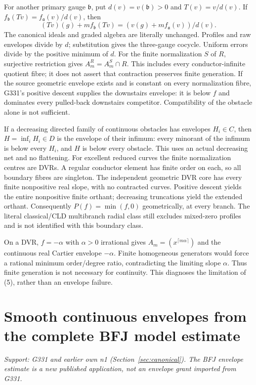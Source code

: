 \documentclass[11pt]{article}
\begin{document}
For another primary gauge $\mathfrak b$, put $d(v)=v(\mathfrak b)>0$ and $T(v)=v/d(v)$. If $f_{\mathfrak b}(Tv)=f_{\mathfrak a}(v)/d(v)$, then
\[
 (Tv)(g)+mf_{\mathfrak b}(Tv)=(v(g)+mf_{\mathfrak a}(v))/d(v).
\]
The canonical ideals and graded algebra are literally unchanged. Profiles and raw envelopes divide by $d$; substitution gives the three-gauge cocycle. Uniform errors divide by the positive minimum of $d$. For the finite normalization $S$ of $R$, surjective restriction gives $A_m^R=A_m^S\cap R$. This includes every conductor-infinite quotient fibre; it does not assert that contraction preserves finite generation. If the source geometric envelope exists and is constant on every normalization fibre, G331's positive descent supplies the downstairs envelope: it is below $f$ and dominates every pulled-back downstairs competitor. Compatibility of the obstacle alone is not sufficient.

If a decreasing directed family of continuous obstacles has envelopes $H_i\in C$, then $H=\inf_iH_i\in D$ is the envelope of their infimum: every minorant of the infimum is below every $H_i$, and $H$ is below every obstacle. This uses an actual decreasing net and no flattening. For excellent reduced curves the finite normalization centres are DVRs. A regular conductor element has finite order on each, so all boundary fibres are singleton. The independent geometric DVR core has every finite nonpositive real slope, with no contracted curves. Positive descent yields the entire nonpositive finite orthant; decreasing truncations yield the extended orthant. Consequently $P(f)=\min(f,0)$ geometrically, at every branch. The literal classical/CLD multibranch radial class still excludes mixed-zero profiles and is not identified with this boundary class.

On a DVR, $f=-\alpha$ with $\alpha>0$ irrational gives $A_m=(x^{\lceil m\alpha\rceil})$ and the continuous real Cartier envelope $-\alpha$. Finite homogeneous generators would force a rational minimum order/degree ratio, contradicting the limiting slope $\alpha$. Thus finite generation is not necessary for continuity. This diagnoses the limitation of (5), rather than an envelope failure.


\section{Smooth continuous envelopes from the complete BFJ model estimate}
\label{sec:smooth}
\textit{Support: G331 and earlier own n1 (Section~\ref{sec:canonical}). The BFJ envelope estimate is a new published application, not an envelope grant imported from G331.}
\end{document}
